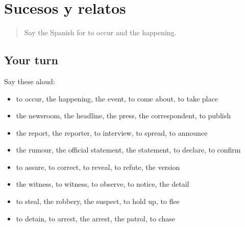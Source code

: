 \section[(dialogue)]{Sucesos y relatos}

\label{lesson:ES-R519-repaso-512-519}



\begin{quote}
Say the Spanish for to occur and the happening.
\end{quote}

\subsection*{Your turn}
Say these aloud:

\begin{itemize}
\raggedright
  \item to occur, the happening, the event, to come about, to take place
  \item the newsroom, the headline, the press, the correspondent, to publish
  \item the report, the reporter, to interview, to spread, to announce
  \item the rumour, the official statement, the statement, to declare, to confirm
  \item to assure, to correct, to reveal, to refute, the version
  \item the witness, to witness, to observe, to notice, the detail
  \item to steal, the robbery, the suspect, to hold up, to flee
  \item to detain, to arrest, the arrest, the patrol, to chase
\end{itemize}

